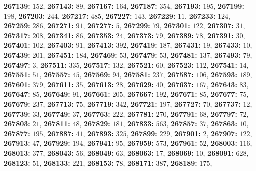 \textsf{\bfseries 267139:} $152$, \textsf{\bfseries 267143:} $89$, \textsf{\bfseries 267167:} $164$, \textsf{\bfseries 267187:} $354$, \textsf{\bfseries 267193:} $195$, \textsf{\bfseries 267199:} $198$, \textsf{\bfseries 267203:} $244$, \textsf{\bfseries 267217:} $485$, \textsf{\bfseries 267227:} $143$, \textsf{\bfseries 267229:} $11$, \textsf{\bfseries 267233:} $124$, \textsf{\bfseries 267259:} $286$, \textsf{\bfseries 267271:} $91$, \textsf{\bfseries 267277:} $5$, \textsf{\bfseries 267299:} $79$, \textsf{\bfseries 267301:} $122$, \textsf{\bfseries 267307:} $31$, \textsf{\bfseries 267317:} $208$, \textsf{\bfseries 267341:} $86$, \textsf{\bfseries 267353:} $24$, \textsf{\bfseries 267373:} $79$, \textsf{\bfseries 267389:} $78$, \textsf{\bfseries 267391:} $30$, \textsf{\bfseries 267401:} $102$, \textsf{\bfseries 267403:} $91$, \textsf{\bfseries 267413:} $392$, \textsf{\bfseries 267419:} $187$, \textsf{\bfseries 267431:} $19$, \textsf{\bfseries 267433:} $10$, \textsf{\bfseries 267439:} $201$, \textsf{\bfseries 267451:} $184$, \textsf{\bfseries 267469:} $53$, \textsf{\bfseries 267479:} $53$, \textsf{\bfseries 267481:} $137$, \textsf{\bfseries 267493:} $79$, \textsf{\bfseries 267497:} $3$, \textsf{\bfseries 267511:} $335$, \textsf{\bfseries 267517:} $132$, \textsf{\bfseries 267521:} $60$, \textsf{\bfseries 267523:} $112$, \textsf{\bfseries 267541:} $14$, \textsf{\bfseries 267551:} $51$, \textsf{\bfseries 267557:} $45$, \textsf{\bfseries 267569:} $94$, \textsf{\bfseries 267581:} $237$, \textsf{\bfseries 267587:} $106$, \textsf{\bfseries 267593:} $189$, \textsf{\bfseries 267601:} $379$, \textsf{\bfseries 267611:} $35$, \textsf{\bfseries 267613:} $28$, \textsf{\bfseries 267629:} $40$, \textsf{\bfseries 267637:} $167$, \textsf{\bfseries 267643:} $83$, \textsf{\bfseries 267647:} $85$, \textsf{\bfseries 267649:} $91$, \textsf{\bfseries 267661:} $205$, \textsf{\bfseries 267667:} $192$, \textsf{\bfseries 267671:} $85$, \textsf{\bfseries 267677:} $75$, \textsf{\bfseries 267679:} $237$, \textsf{\bfseries 267713:} $75$, \textsf{\bfseries 267719:} $342$, \textsf{\bfseries 267721:} $197$, \textsf{\bfseries 267727:} $70$, \textsf{\bfseries 267737:} $12$, \textsf{\bfseries 267739:} $33$, \textsf{\bfseries 267749:} $37$, \textsf{\bfseries 267763:} $222$, \textsf{\bfseries 267781:} $270$, \textsf{\bfseries 267791:} $68$, \textsf{\bfseries 267797:} $72$, \textsf{\bfseries 267803:} $21$, \textsf{\bfseries 267811:} $48$, \textsf{\bfseries 267829:} $181$, \textsf{\bfseries 267833:} $563$, \textsf{\bfseries 267857:} $37$, \textsf{\bfseries 267863:} $10$, \textsf{\bfseries 267877:} $195$, \textsf{\bfseries 267887:} $41$, \textsf{\bfseries 267893:} $325$, \textsf{\bfseries 267899:} $229$, \textsf{\bfseries 267901:} $2$, \textsf{\bfseries 267907:} $122$, \textsf{\bfseries 267913:} $47$, \textsf{\bfseries 267929:} $194$, \textsf{\bfseries 267941:} $95$, \textsf{\bfseries 267959:} $573$, \textsf{\bfseries 267961:} $52$, \textsf{\bfseries 268003:} $116$, \textsf{\bfseries 268013:} $377$, \textsf{\bfseries 268043:} $56$, \textsf{\bfseries 268049:} $63$, \textsf{\bfseries 268063:} $17$, \textsf{\bfseries 268069:} $10$, \textsf{\bfseries 268091:} $628$, \textsf{\bfseries 268123:} $51$, \textsf{\bfseries 268133:} $221$, \textsf{\bfseries 268153:} $78$, \textsf{\bfseries 268171:} $387$, \textsf{\bfseries 268189:} $175$, 

